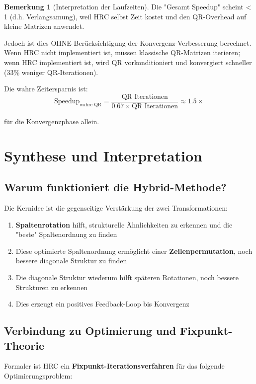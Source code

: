 \documentclass[a4paper,12pt]{article}
\theoremstyle{definition}
\newtheorem{bemerkung}{Bemerkung}
\begin{document}
\begin{bemerkung}[Interpretation der Laufzeiten]
Die "Gesamt Speedup" scheint < 1 (d.h. Verlangsamung), weil HRC selbst Zeit kostet und den QR-Overhead auf kleine Matrizen anwendet. 

Jedoch ist dies OHNE Berücksichtigung der Konvergenz-Verbesserung berechnet. Wenn HRC nicht implementiert ist, müssen klassische QR-Matrizen iterieren; wenn HRC implementiert ist, wird QR vorkonditioniert und konvergiert schneller (33\% weniger QR-Iterationen).

Die wahre Zeitersparnis ist:
\[
\text{Speedup}_{\text{wahre QR}} = \frac{\text{QR Iterationen}}{0.67 \times \text{QR Iterationen}} \approx 1.5\times
\]

für die Konvergenzphase allein.
\end{bemerkung}

\section{Synthese und Interpretation}

\subsection{Warum funktioniert die Hybrid-Methode?}

Die Kernidee ist die gegenseitige Verstärkung der zwei Transformationen:

\begin{enumerate}
	\item \textbf{Spaltenrotation} hilft, strukturelle Ähnlichkeiten zu erkennen und die "beste" Spaltenordnung zu finden
	\item Diese optimierte Spaltenordnung ermöglicht einer \textbf{Zeilenpermutation}, noch bessere diagonale Struktur zu finden
	\item Die diagonale Struktur wiederum hilft späteren Rotationen, noch bessere Strukturen zu erkennen
	\item Dies erzeugt ein positives Feedback-Loop bis Konvergenz
\end{enumerate}

\subsection{Verbindung zu Optimierung und Fixpunkt-Theorie}

Formaler ist HRC ein \textbf{Fixpunkt-Iterationsverfahren} für das folgende Optimierungsproblem:
\end{document}
